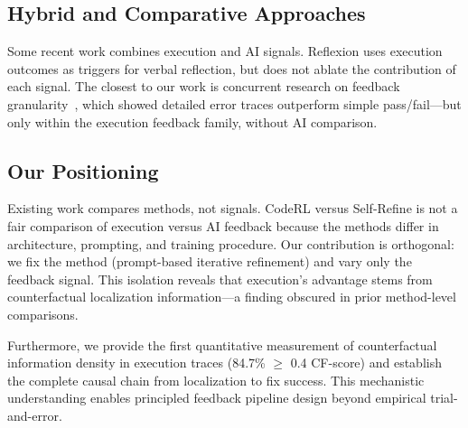 \subsection{Hybrid and Comparative Approaches}

Some recent work combines execution and AI signals. Reflexion uses execution outcomes as triggers for verbal reflection, but does not ablate the contribution of each signal. The closest to our work is concurrent research on feedback granularity~\cite{selfedit2023}, which showed detailed error traces outperform simple pass/fail---but only within the execution feedback family, without AI comparison.

\subsection{Our Positioning}

Existing work compares methods, not signals. CodeRL versus Self-Refine is not a fair comparison of execution versus AI feedback because the methods differ in architecture, prompting, and training procedure. Our contribution is orthogonal: we fix the method (prompt-based iterative refinement) and vary only the feedback signal. This isolation reveals that execution's advantage stems from counterfactual localization information---a finding obscured in prior method-level comparisons.

Furthermore, we provide the first quantitative measurement of counterfactual information density in execution traces (84.7\% $\geq$ 0.4 CF-score) and establish the complete causal chain from localization to fix success. This mechanistic understanding enables principled feedback pipeline design beyond empirical trial-and-error.
